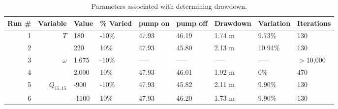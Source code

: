 \documentclass[titlepage,11pt]{article}
\begin{document}
\begin{table}[!h]
\begin{center}
\caption{Parameters associated with determining drawdown.}
\begin{tabular}{|r|r|l|l|l|l|l|l|l|}
\hline
{\bf Run \#} & {\bf Variable} & {\bf Value}  & {\bf \% Varied} & {\bf pump on} & {\bf pump off} &{\bf Drawdown}    &{\bf Variation} & {\bf Iterations}\\
\hline
         1   &       $T$      &     180      &       -10\%     & 47.93          &46.19          &  1.74 m           &9.73\%          &     130\\
         2   &                &     220      &        10\%     & 47.93          &45.80          &   2.13 m          &10.94\%         &    130 \\
\hline
         3   &     $\omega$   &      1.675   &       -10\%     &-----           &-----          &  -----           &-----           &  $>$10,000 \\
         4   &                &    2.000     &        10\%     &47.93           &46.01          &  1.92 m           &0\%             &    470  \\
\hline
         5   &    $Q_{15,15}$ &    -900      &       -10\%     &47.93           &45.82          &  2.11 m           &9.90\%          &  130    \\
         6   &                &    -1100     &        10\%     &47.93           &46.20          & 1.73 m            &9.90\%          &   130\\
\hline
\end{tabular}
\end{center}
\end{table}
\end{document}
